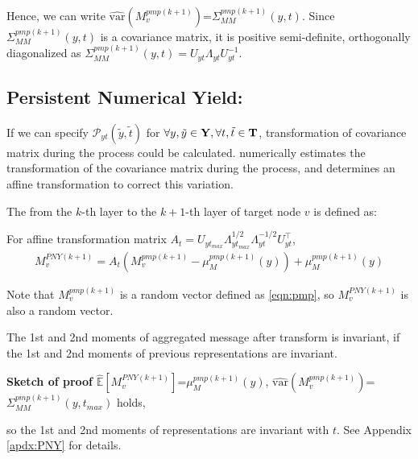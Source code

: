 \vspace{-5pt}
Hence, we can write $\hat{\text{var}}(M_{v}^{pmp(k+1)})$=$\Sigma^{pmp(k+1)}_{MM}(y,t)$. Since $\Sigma^{pmp(k+1)}_{MM}(y,t)$ is a covariance matrix, it is positive semi-definite, orthogonally diagonalized as $\Sigma^{pmp(k+1)}_{MM}(y,t) = U_{y t}\Lambda_{y t}U_{y t}^{-1}$.


\subsection{Persistent Numerical Yield: \PNY}
\vspace{-5pt}

If we can specify $\mathcal{P}_{y t}(\tilde{y}, \tilde{t})$ for $\forall y, \tilde{y} \in \bold{Y}, \forall t, \tilde{t} \in \bold{T}$, transformation of covariance matrix during the \PMP process could be calculated. \PNY numerically estimates the transformation of the covariance matrix during the \PMP process, and determines an affine transformation to correct this variation.


\begin{definition}\label{def:env1}
The \PNY from the $k$-th layer to the $k+1$-th layer of target node $v$ is defined as:

For affine transformation matrix $A_{t} = U_{y t_{max}} \Lambda_{y t_{max}}^{1/2} \Lambda_{y t}^{-1/2} U_{y t}^{\top}$, \\

\vspace{-23pt}
\begin{align}
M_v^{PNY(k+1)} = A_{t}(M_v^{pmp (k+1)}-\mu_{M}^{pmp(k+1)}(y))+\mu_{M}^{pmp(k+1)}(y)
\end{align}

\vspace{-12pt}
\end{definition}

Note that $M_v^{pmp (k+1)}$ is a random vector defined as \ref{eqn:pmp}, so $M_v^{PNY(k+1)}$ is also a random vector.

\begin{theorem}\label{thm:pny}
The 1st and 2nd moments of aggregated message after \PNY transform is invariant, if the 1st and 2nd moments of previous representations are invariant.\\

\vspace{-10pt}

\textbf{Sketch of proof} $\hat{\mathbb E}\left[{M_{ v}^{PNY(k+1)}}\right]$=$\mu_{M}^{pmp(k+1)}(y)$, $\hat{\text{var}}(M_{v}^{pmp(k+1)})$=$\Sigma^{pmp(k+1)}_{MM}(y,t_{max})$ holds,

so the 1st and 2nd moments of representations are invariant with $t$. See Appendix \ref{apdx:PNY} for details.
\end{theorem}


